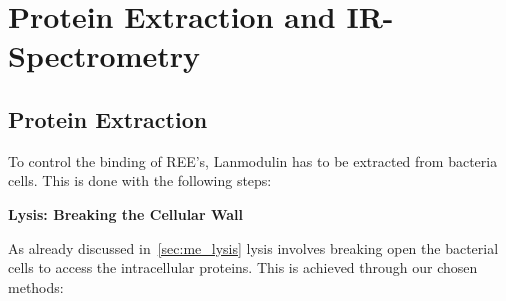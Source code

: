 \chapter{Protein Extraction and IR-Spectrometry\authorB{}}
\section{Protein Extraction}
To control the binding of REE’s, Lanmodulin has to be extracted from bacteria cells. This is
done with the following steps:

\textbf{Lysis: Breaking the Cellular Wall}

As already discussed in~\ref{sec:me_lysis} lysis involves breaking open the bacterial cells to access the
intracellular proteins. This is achieved through our chosen methods:


